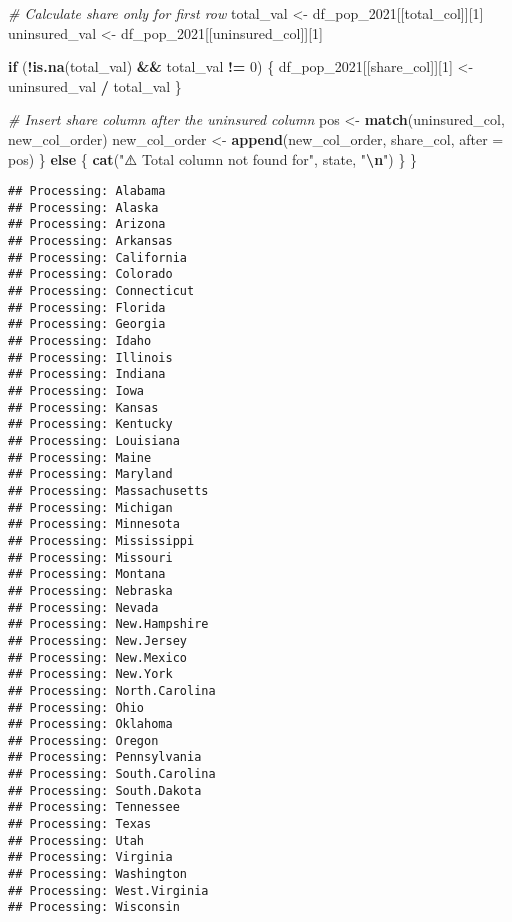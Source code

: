 \documentclass[
]{article}
\newenvironment{Shaded}{\begin{snugshade}}{\end{snugshade}}
\newcommand{\AttributeTok}[1]{\textcolor[rgb]{0.13,0.29,0.53}{#1}}
\newcommand{\CommentTok}[1]{\textcolor[rgb]{0.56,0.35,0.01}{\textit{#1}}}
\newcommand{\ControlFlowTok}[1]{\textcolor[rgb]{0.13,0.29,0.53}{\textbf{#1}}}
\newcommand{\DecValTok}[1]{\textcolor[rgb]{0.00,0.00,0.81}{#1}}
\newcommand{\FunctionTok}[1]{\textcolor[rgb]{0.13,0.29,0.53}{\textbf{#1}}}
\newcommand{\NormalTok}[1]{#1}
\newcommand{\OtherTok}[1]{\textcolor[rgb]{0.56,0.35,0.01}{#1}}
\newcommand{\SpecialCharTok}[1]{\textcolor[rgb]{0.81,0.36,0.00}{\textbf{#1}}}
\newcommand{\StringTok}[1]{\textcolor[rgb]{0.31,0.60,0.02}{#1}}
\begin{document}
\begin{Shaded}
\begin{Highlighting}[]
    \CommentTok{\# Calculate share only for first row}
\NormalTok{    total\_val }\OtherTok{\textless{}{-}}\NormalTok{ df\_pop\_2021[[total\_col]][}\DecValTok{1}\NormalTok{]}
\NormalTok{    uninsured\_val }\OtherTok{\textless{}{-}}\NormalTok{ df\_pop\_2021[[uninsured\_col]][}\DecValTok{1}\NormalTok{]}
    
    \ControlFlowTok{if}\NormalTok{ (}\SpecialCharTok{!}\FunctionTok{is.na}\NormalTok{(total\_val) }\SpecialCharTok{\&\&}\NormalTok{ total\_val }\SpecialCharTok{!=} \DecValTok{0}\NormalTok{) \{}
\NormalTok{      df\_pop\_2021[[share\_col]][}\DecValTok{1}\NormalTok{] }\OtherTok{\textless{}{-}}\NormalTok{ uninsured\_val }\SpecialCharTok{/}\NormalTok{ total\_val}
\NormalTok{    \}}
    
    \CommentTok{\# Insert share column after the uninsured column}
\NormalTok{    pos }\OtherTok{\textless{}{-}} \FunctionTok{match}\NormalTok{(uninsured\_col, new\_col\_order)}
\NormalTok{    new\_col\_order }\OtherTok{\textless{}{-}} \FunctionTok{append}\NormalTok{(new\_col\_order, share\_col, }\AttributeTok{after =}\NormalTok{ pos)}
\NormalTok{  \} }\ControlFlowTok{else}\NormalTok{ \{}
    \FunctionTok{cat}\NormalTok{(}\StringTok{"⚠️ Total column not found for"}\NormalTok{, state, }\StringTok{"}\SpecialCharTok{\textbackslash{}n}\StringTok{"}\NormalTok{)}
\NormalTok{  \}}
\NormalTok{\}}
\end{Highlighting}
\end{Shaded}

\begin{verbatim}
## Processing: Alabama 
## Processing: Alaska 
## Processing: Arizona 
## Processing: Arkansas 
## Processing: California 
## Processing: Colorado 
## Processing: Connecticut 
## Processing: Florida 
## Processing: Georgia 
## Processing: Idaho 
## Processing: Illinois 
## Processing: Indiana 
## Processing: Iowa 
## Processing: Kansas 
## Processing: Kentucky 
## Processing: Louisiana 
## Processing: Maine 
## Processing: Maryland 
## Processing: Massachusetts 
## Processing: Michigan 
## Processing: Minnesota 
## Processing: Mississippi 
## Processing: Missouri 
## Processing: Montana 
## Processing: Nebraska 
## Processing: Nevada 
## Processing: New.Hampshire 
## Processing: New.Jersey 
## Processing: New.Mexico 
## Processing: New.York 
## Processing: North.Carolina 
## Processing: Ohio 
## Processing: Oklahoma 
## Processing: Oregon 
## Processing: Pennsylvania 
## Processing: South.Carolina 
## Processing: South.Dakota 
## Processing: Tennessee 
## Processing: Texas 
## Processing: Utah 
## Processing: Virginia 
## Processing: Washington 
## Processing: West.Virginia 
## Processing: Wisconsin
\end{verbatim}
\end{document}
